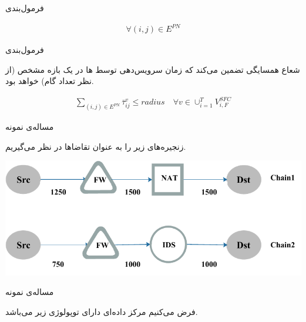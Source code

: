 \documentclass{beamer}
\begin{document}
\begin{persian}
\begin{frame}{فرمول‌بندی}
\begin{latin}
\begin{align}
        \forall (i, j) \in E^{PN}
    \end{align}\end{latin}
\end{frame}
\begin{frame}{فرمول‌بندی}
    \par
    شعاع همسایگی تضمین می‌کند که زمان سرویس‌دهی توسط
    ها
    در یک بازه مشخص (از نظر تعداد گام)
    خواهد بود.
    \begin{latin}\begin{align}
        \sum_{(i, j) \in E^{PN}} \bar{\tau}_{ij}^{v} \le radius
        \quad
        \forall v \in \cup_{i=1}^T V_{i, F}^{SFC}
    \end{align}\end{latin}
\end{frame}
\begin{frame}{مساله‌ی نمونه}
    \par
    زنجیره‌های زیر را به عنوان تقاضاها در نظر می‌گیریم.

    \begin{center}
        \includegraphics[scale=0.5]{../diagrams/chains.pdf}
    \end{center}
\end{frame}
\begin{frame}{مساله‌ی نمونه}
    \par
    فرض می‌کنیم مرکز داده‌ای دارای توپولوژی زیر می‌باشد.


\end{frame}
\end{persian}
\end{document}
